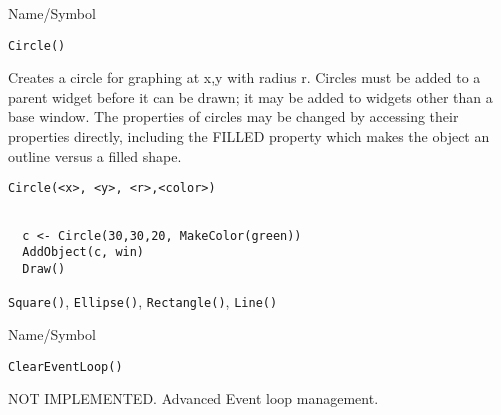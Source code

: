 \rl


\begin{desc}{Name/Symbol}
\item[Name/Symbol]	\verb+Circle()+

\item[Description] Creates a circle for graphing at x,y with radius r.
  Circles must be added to a parent widget before it can be drawn; it
  may be added to widgets other than a base window. The properties of
  circles may be changed by accessing their properties directly,
  including the FILLED property which makes the object an outline
  versus a filled shape.


\item[Usage]
\begin{verbatim}
Circle(<x>, <y>, <r>,<color>)
\end{verbatim}

\item[Example]	
\begin{verbatim}
  
  c <- Circle(30,30,20, MakeColor(green))
  AddObject(c, win)
  Draw()

\end{verbatim}
\item[See Also]	\verb+Square()+, \verb+Ellipse()+, \verb+Rectangle()+, \verb+Line()+
\end{desc}

\rl



\begin{desc}{Name/Symbol}
\item[Name/Symbol]  	\verb+ClearEventLoop()+

\item[Description]  	NOT IMPLEMENTED. Advanced Event loop management.

\item[Usage]		

\item[Example]	

\item[See Also]	
\end{desc}

\rl



